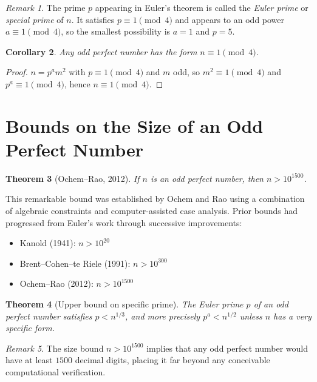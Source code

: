 \documentclass[12pt,a4paper]{amsart}
\newtheorem{theorem}{Theorem}[section]
\newtheorem{corollary}[theorem]{Corollary}
\theoremstyle{definition}
\theoremstyle{remark}
\newtheorem{remark}[theorem]{Remark}
\begin{document}
\begin{remark}
The prime $p$ appearing in Euler's theorem is called the \emph{Euler prime}
or \emph{special prime} of $n$.
It satisfies $p \equiv 1 \pmod{4}$ and appears to an odd power $a \equiv 1 \pmod 4$,
so the smallest possibility is $a = 1$ and $p = 5$.
\end{remark}

\begin{corollary}
\label{cor:form}
Any odd perfect number has the form $n \equiv 1 \pmod{4}$.
\end{corollary}

\begin{proof}
$n = p^a m^2$ with $p \equiv 1 \pmod{4}$ and $m$ odd,
so $m^2 \equiv 1 \pmod{4}$ and $p^a \equiv 1 \pmod{4}$, hence $n \equiv 1 \pmod{4}$.
\end{proof}

\section{Bounds on the Size of an Odd Perfect Number}

\begin{theorem}[Ochem--Rao, 2012]
\label{thm:ochem}
If $n$ is an odd perfect number, then $n > 10^{1500}$.
\end{theorem}

This remarkable bound was established by Ochem and Rao using a combination
of algebraic constraints and computer-assisted case analysis.
Prior bounds had progressed from Euler's work through successive improvements:
\begin{itemize}[nosep]
  \item Kanold (1941): $n > 10^{20}$
  \item Brent--Cohen--te Riele (1991): $n > 10^{300}$
  \item Ochem--Rao (2012): $n > 10^{1500}$
\end{itemize}

\begin{theorem}[Upper bound on specific prime]
The Euler prime $p$ of an odd perfect number satisfies $p < n^{1/3}$,
and more precisely $p^a < n^{1/2}$ unless $n$ has a very specific form.
\end{theorem}

\begin{remark}
The size bound $n > 10^{1500}$ implies that any odd perfect number would have
at least $1500$ decimal digits, placing it far beyond any conceivable
computational verification.
\end{remark}
\end{document}
